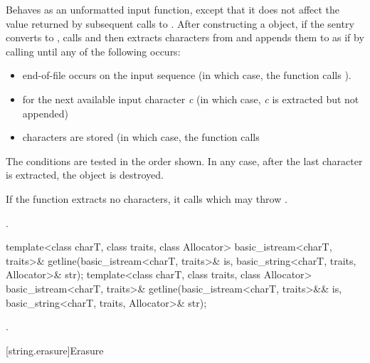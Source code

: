 \begin{itemdescr}
\pnum
\effects
Behaves as an unformatted input function,
except that it does not affect the value returned by subsequent calls to
.
After constructing a
object, if the sentry converts to , calls
and then extracts characters from  and appends them
to  as if by calling
until any of the following occurs:

\begin{itemize}
\item
end-of-file occurs on the input sequence
(in which case, the
function calls
).
\item
{}
for the next available input character
\textit{c}
(in which case,
\textit{c}
is extracted but not appended)
\item
{}
characters are stored
(in which case,
the function calls
\end{itemize}

\pnum
The conditions are tested in the order shown.
In any case,
after the last character is extracted, the
object is destroyed.

\pnum
If the function extracts no characters, it calls
which may throw
.

\pnum
\returns
{}.
\end{itemdescr}

%
\begin{itemdecl}
template<class charT, class traits, class Allocator>
  basic_istream<charT, traits>&
    getline(basic_istream<charT, traits>& is,
            basic_string<charT, traits, Allocator>& str);
template<class charT, class traits, class Allocator>
  basic_istream<charT, traits>&
    getline(basic_istream<charT, traits>&& is,
            basic_string<charT, traits, Allocator>& str);
\end{itemdecl}

\begin{itemdescr}
\pnum
\returns
{}.
\end{itemdescr}

[string.erasure]{Erasure}

